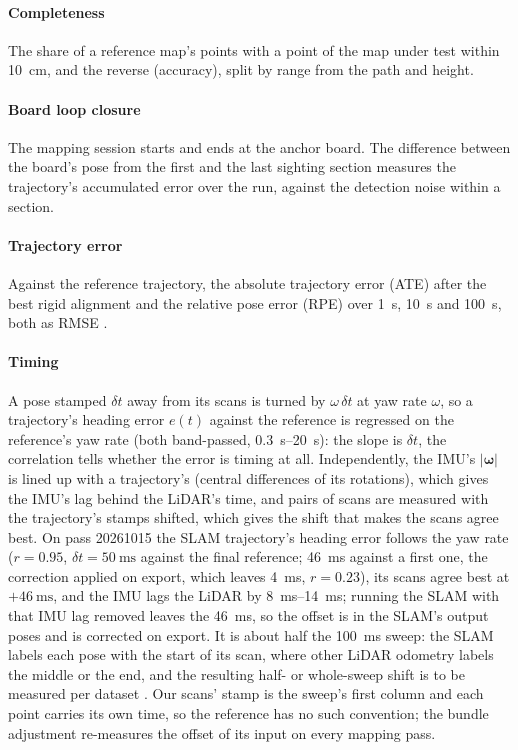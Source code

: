 \paragraph{Completeness} The share of a reference map's points with a point
of the map under test within \SI{10}{\centi\metre}, and the reverse
(accuracy), split by range from the path and height.

\paragraph{Board loop closure} The mapping session starts and ends at the
anchor board. The difference between the board's pose from the first and
the last sighting section measures the trajectory's accumulated error over
the run, against the detection noise within a section.

\paragraph{Trajectory error} Against the reference trajectory, the absolute
trajectory error (ATE) after the best rigid alignment and the relative pose
error (RPE) over \SI{1}{\second}, \SI{10}{\second} and \SI{100}{\second},
both as RMSE \cite{sturm2012}.

\paragraph{Timing} A pose stamped $\delta t$ away from its scans is turned
by $\omega\,\delta t$ at yaw rate $\omega$, so a trajectory's heading error
$e(t)$ against the reference is regressed on the reference's yaw rate (both
band-passed, \SIrange{0.3}{20}{\second}): the slope is $\delta t$, the
correlation tells whether the error is timing at all. Independently, the
IMU's $|\boldsymbol\omega|$ is lined up with a trajectory's (central
differences of its rotations), which gives the IMU's lag behind the LiDAR's
time, and pairs of scans are measured with the trajectory's stamps shifted,
which gives the shift that makes the scans agree best. On pass 20261015 the
SLAM trajectory's heading error follows the yaw rate ($r=0.95$,
$\delta t=\SI{50}{\milli\second}$ against the final reference;
\SI{46}{\milli\second} against a first one, the correction applied on
export, which leaves \SI{4}{\milli\second}, $r=0.23$), its scans agree best
at $+\SI{46}{\milli\second}$, and the IMU lags the LiDAR by
\SIrange{8}{14}{\milli\second}; running the SLAM with that IMU lag removed
leaves the \SI{46}{\milli\second}, so the offset is in the SLAM's output
poses and is corrected on export. It is about half the
\SI{100}{\milli\second} sweep: the SLAM labels each pose with the start of
its scan, where other LiDAR odometry labels the middle or the end, and the
resulting half- or whole-sweep shift is to be measured per dataset
\cite{molaglim}. Our scans' stamp is the sweep's first column and each
point carries its own time, so the reference has no such convention; the
bundle adjustment re-measures the offset of its input on every mapping pass.

